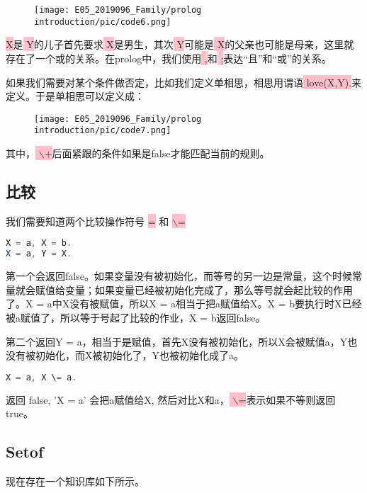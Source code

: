 \documentclass[a4paper, 11pt]{article}
\begin{document}
\begin{figure}[H]
\centering
\texttt{[image: E05\_2019096\_Family/prolog introduction/pic/code6.png]}
\label{fig:label}
\end{figure}


\colorbox{pink}{\color{black} X}是\colorbox{pink}{\color{black} Y}的儿子首先要求\colorbox{pink}{\color{black} X}是男生，其次\colorbox{pink}{\color{black} Y}可能是\colorbox{pink}{\color{black} X}的父亲也可能是母亲，这里就存在了一个或的关系。在prolog中，我们使用\colorbox{pink}{\color{black} ,}和\colorbox{pink}{\color{black} ;}表达“且”和“或”的关系。

如果我们需要对某个条件做否定，比如我们定义单相思，相思用谓语\colorbox{pink}{\color{black} love(X,Y).}来定义。于是单相思可以定义成：
\begin{figure}[H]
\centering
\texttt{[image: E05\_2019096\_Family/prolog introduction/pic/code7.png]}
\label{fig:label}
\end{figure}
其中，\colorbox{pink}{\color{black} $\backslash$+}后面紧跟的条件如果是false才能匹配当前的规则。

\subsection{比较}
我们需要知道两个比较操作符号 \colorbox{pink}{\color{black} =} 和 \colorbox{pink}{\color{black} $\backslash$=}
\begin{lstlisting}[language={java}]
X = a, X = b.
X = a, Y = X.
\end{lstlisting}

第一个会返回false。如果变量没有被初始化，而等号的另一边是常量，这个时候常量就会赋值给变量；如果变量已经被初始化完成了，那么等号就会起比较的作用了。X = a中X没有被赋值，所以X = a相当于把a赋值给X。X = b要执行时X已经被a赋值了，所以等于号起了比较的作业，X = b返回false。


第二个返回Y = a，相当于是赋值，首先X没有被初始化，所以X会被赋值a，Y也没有被初始化，而X被初始化了，Y也被初始化成了a。

\begin{lstlisting}[language={java}]
X = a, X \= a.
\end{lstlisting}

返回 false, 'X = a' 会把a赋值给X, 然后对比X和a，\colorbox{pink}{\color{black} $\backslash$=}表示如果不等则返回true。

\subsection{Setof}
现在存在一个知识库如下所示。
\end{document}
